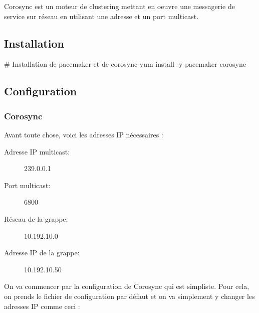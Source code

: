 \documentclass[11pt,a4paper]{report}
\begin{document}
                Corosync est un moteur de clustering mettant en oeuvre une messagerie de service sur r\'eseau en utilisant une adresse et un port multicast.
                
            \subsection{Installation}
                
                \begin{bashcode}
                    # Installation de pacemaker et de corosync
                    yum install -y pacemaker corosync
                \end{bashcode}
                
            \subsection{Configuration}
                
                \subsubsection{Corosync}
                    
                    Avant toute chose, voici les adresses IP n\'ecessaires :\\
                    
                    \begin{description}
                        \item[Adresse IP multicast:] 239.0.0.1
                        \item[Port multicast:] 6800
                        \item[R\'eseau de la grappe:] 10.192.10.0
                        \item[Adresse IP de la grappe:] 10.192.10.50
                    \end{description}
                    
                    On va commencer par la configuration de Corosync qui est simpliste. Pour cela, on prends le fichier de configuration par d\'efaut et on va simplement y changer les adresses IP comme ceci :\\
                    
                    
\end{document}

